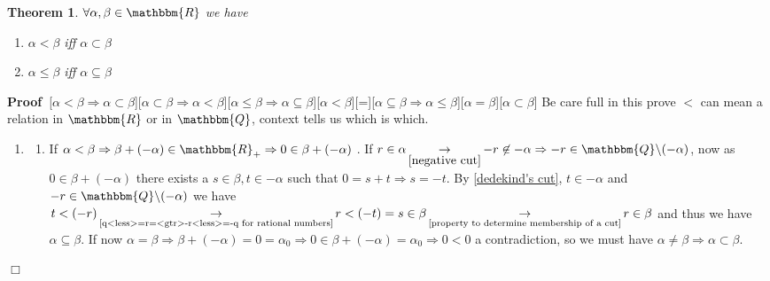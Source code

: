 \documentclass{book}
\newcommand{\Rightarrowlim}{\mathop{\rightarrow}\limits}
\newcommand{\nin}{\not\in}
\newcommand{\um}{-}
\newcommand{\upl}{+}
\newenvironment{proof}{\noindent\textbf{Proof\ }}{\hspace*{\fill}$\Box$\medskip}
\newtheorem{theorem}{Theorem}
\begin{document}
{{\begin{theorem}
  \label{equivalence of order and subset in the reals}$\forall \alpha, \beta
  \in \mathbbm{R}$ we have
  \begin{enumerate}
    \item $\alpha < \beta$ iff $\alpha \subset \beta$
    
    \item $\alpha \leqslant \beta$ iff $\alpha \subseteq \beta$
  \end{enumerate}
\end{theorem}

\begin{proof}[$\alpha < \beta \Rightarrow \alpha \subset \beta$][$\alpha
\subset \beta \Rightarrow \alpha < \beta$][$\alpha \leqslant \beta \Rightarrow
\alpha \subseteq \beta$][$\alpha < \beta$][{\alpha}={\beta}][$\alpha \subseteq
\beta \Rightarrow \alpha \leqslant \beta$][$\alpha = \beta$][$\alpha \subset
\beta$]
  Be care full in this prove $<$ can mean a relation in $\mathbbm{R}$ or in
  $\mathbbm{Q}$, context tells us which is which.
  \begin{enumerate}
    \item 
    \begin{enumerate}
      \item If $\alpha < \beta \Rightarrow \beta \upl (\um \alpha) \in
      \mathbbm{R}_+ \Rightarrow 0 \in \beta \upl (\um \alpha)$ . If $r \in
      \alpha \Rightarrowlim_{\ref{negative cut}} - r \nin - \alpha \Rightarrow
      - r \in \mathbbm{Q} \backslash (- \alpha)$, now as $0 \in \beta \upl
      (\um \alpha)$ there exists a $s \in \beta, t \in - \alpha$ such that $0
      = s \upl t \Rightarrow s = - t$. By \ref{dedekind's cut}, $t \in -
      \alpha$ and $- r \in \mathbbm{Q} \backslash (- \alpha)$ we have $t <
      (\um r) \Rightarrowlim_{\text{\ref{q<less>=r=<gtr>-r<less>=-q for
      rational numbers}}} r < (- t) = s \in \beta
      \Rightarrowlim_{\text{\ref{property to determine membership of a cut}}}
      r \in \beta$ and thus we have $\alpha \subseteq \beta$. If now $\alpha =
      \beta \Rightarrow \beta \upl (- \alpha) = 0 = \alpha_0 \Rightarrow 0 \in
      \beta \upl (- \alpha) = \alpha_0 \Rightarrow 0 < 0$ a contradiction, so
      we must have $\alpha \neq \beta \Rightarrow \alpha \subset \beta$.
      

\end{enumerate}
\end{enumerate}
\end{proof}}}
\end{document}
